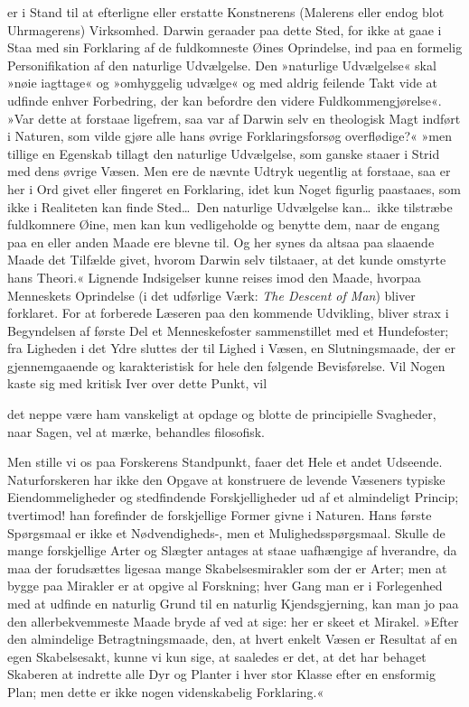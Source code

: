 \documentclass[12pt,a4paper]{article}
\begin{document}
er i Stand til at efterligne eller erstatte Konstnerens (Malerens eller
endog blot Uhrmagerens) Virksomhed. Darwin geraader paa dette Sted,
for ikke at gaae i Staa med sin Forklaring af de fuldkomneste Øines
Oprindelse, ind paa en formelig Personifikation af den naturlige
Udvælgelse. Den »naturlige Udvælgelse« skal »nøie iagttage« og
»omhyggelig udvælge« og med aldrig feilende Takt vide at udfinde
enhver Forbedring, der kan befordre den videre Fuldkommengjørelse«.
»Var dette at forstaae ligefrem, saa var af Darwin selv en theologisk
Magt indført i Naturen, som vilde gjøre alle hans øvrige
Forklaringsforsøg overflødige?« »men tillige en Egenskab tillagt den
naturlige Udvælgelse, som ganske staaer i Strid med dens øvrige Væsen.
Men ere de nævnte Udtryk uegentlig at forstaae, saa er her i Ord givet
eller fingeret en Forklaring, idet kun Noget figurlig paastaaes, som
ikke i Realiteten kan finde Sted\ldots\ Den naturlige Udvælgelse
kan\ldots\ ikke tilstræbe fuldkomnere Øine, men kan kun vedligeholde
og benytte dem, naar de engang paa en eller anden Maade ere blevne
til. Og her synes da altsaa paa slaaende Maade det Tilfælde givet,
hvorom Darwin selv tilstaaer, at det kunde omstyrte hans Theori.«
Lignende Indsigelser kunne reises imod den Maade, hvorpaa Menneskets
Oprindelse (i det udførlige Værk: \emph{The Descent of Man}) bliver
forklaret. For at forberede Læseren paa den kommende Udvikling, bliver
strax i Begyndelsen af første Del et Menneskefoster sammenstillet med
et Hundefoster; fra Ligheden i det Ydre sluttes der til Lighed i
Væsen, en Slutningsmaade, der er gjennemgaaende og karakteristisk for
hele den følgende Bevisførelse. Vil Nogen kaste sig med kritisk Iver
over dette Punkt, vil


det neppe være ham vanskeligt at opdage og blotte de principielle
Svagheder, naar Sagen, vel at mærke, behandles filosofisk.

Men stille vi os paa Forskerens Standpunkt, faaer det Hele et andet
Udseende. Naturforskeren har ikke den Opgave at konstruere de levende
Væseners typiske Eiendommeligheder og stedfindende Forskjelligheder ud
af et almindeligt Princip; tvertimod! han forefinder de forskjellige
Former givne i Naturen. Hans første Spørgsmaal er ikke et
Nødvendigheds-, men et Mulighedsspørgsmaal. Skulle de mange forskjellige
Arter og Slægter antages at staae uafhængige af hverandre, da maa der
forudsættes ligesaa mange Skabelsesmirakler som der er Arter; men at
bygge paa Mirakler er at opgive al Forskning; hver Gang man er i
Forlegenhed med at udfinde en naturlig Grund til en naturlig
Kjendsgjerning, kan man jo paa den allerbekvemmeste Maade bryde af ved
at sige: her er skeet et Mirakel. »Efter den almindelige
Betragtningsmaade, den, at hvert enkelt Væsen er Resultat af en egen
Skabelsesakt, kunne vi kun sige, at saaledes er det, at det har
behaget Skaberen at indrette alle Dyr og Planter i hver stor Klasse
efter en ensformig Plan; men dette er ikke nogen videnskabelig
Forklaring.«
\end{document}
